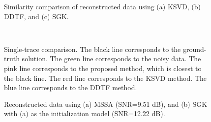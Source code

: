 \begin{figure}[htb!]
\centering
{}
\caption{Similarity comparison of reconstructed data using (a) KSVD, (b) DDTF, and (c) SGK.}
\label{fig:synth-ksvd-simi,synth-ddtf-simi,synth-sgk-simi}
\end{figure}


\begin{figure}[htb!]
\centering
   \\
\caption{}
\label{fig:synth-s-clean,synth-s-noisy,synth-s-obs,synth-s-ksvd,synth-s-ddtf,synth-s-sgk}
\end{figure}


\begin{figure}[htb!]
\centering
{}
\caption{Single-trace comparison. The black line corresponds to the ground-truth solution. The green line corresponds to the noisy data. The pink line corresponds to the proposed method, which is closest to the black line. The red line corresponds to the KSVD method. The blue line corresponds to the DDTF method.}
\label{fig:synth-ss}
\end{figure}


\begin{figure}[htb!]
\centering
{}
\caption{Reconstructed data using (a) MSSA (SNR=9.51 dB), and (b) SGK with (a) as the initialization model (SNR=12.22 dB).}
\label{fig:synth-mssa,synth-mssasgk}
\end{figure}



